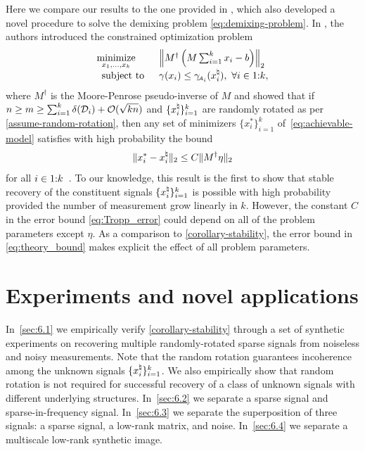 Here we compare our results to the one provided in \cite{mccoy2013achievable}, which also developed a novel procedure to solve the demixing problem \eqref{eq:demixing-problem}. In \cite{mccoy2013achievable}, the authors introduced the constrained optimization problem
\begin{equation}
    \label{eq:achievable-model}
    \begin{array}{ll}
    \displaystyle\mathop{\hbox{\rm minimize}}_{x_1,\ldots,x_k}\enspace
    & \left\|
      M^\dagger\left(M\sum_{i=1}^k x_i - b\right)
    \right\|_2 \\
   \enspace\mathop{\hbox{\rm subject to}}\enspace
    & \gamma(x_i) \le \gamma_{\!\scriptscriptstyle\mathcal{A}_i}(x_i^{\natural}), \ \forall i\in1\mathord{:}k,
    \end{array}
\end{equation}
where $M^\dagger$ is the Moore-Penrose pseudo-inverse of $M$ and showed that if \(n\ge m\ge \sum_{i=1}^k\delta(\mathcal{D}_i)+\mathcal{O}(\sqrt{kn})\) and $\{x_i^{\natural}\}_{i=1}^k$ are randomly rotated as per \autoref{assume-random-rotation}, then any set of minimizers $\{x_i^*\}_{i=1}^k$ of~\eqref{eq:achievable-model} satisfies with high probability the bound
\begin{equation}\label{eq:Tropp_error}
    \|x_i^*-x_i^{\natural}\|_2\le C\|M^\dagger\eta\|_2
\end{equation}
for all $i\in1\mathord{:}k$~\cite[Theorem~A]{mccoy2013achievable}. To our knowledge, this result is the first to show that stable recovery of the constituent signals $\{x_i^{\natural}\}_{i=1}^k$ is possible with high probability provided the number of measurement grow linearly in $k$. However, the constant $C$ in the error bound \eqref{eq:Tropp_error} could depend on all of the problem parameters except $\eta$. As a comparison to \autoref{corollary-stability}, the error bound in \eqref{eq:theory_bound} makes explicit the effect of all problem parameters.

\section{Experiments and novel applications} \label{sec:6}

In~\autoref{sec:6.1} we empirically verify \autoref{corollary-stability} through a set of synthetic experiments on recovering multiple randomly-rotated sparse signals from noiseless and noisy measurements. Note that the random rotation guarantees incoherence among the unknown signals $\{x_i^{\natural}\}_{i=1}^k$. We also empirically show that random rotation is not required for successful recovery of a class of unknown signals with different underlying structures. In~\autoref{sec:6.2} we separate a sparse signal and sparse-in-frequency signal. In~\autoref{sec:6.3} we separate the superposition of three signals: a sparse signal, a low-rank matrix, and noise. In~\autoref{sec:6.4} we separate a multiscale low-rank synthetic image.

